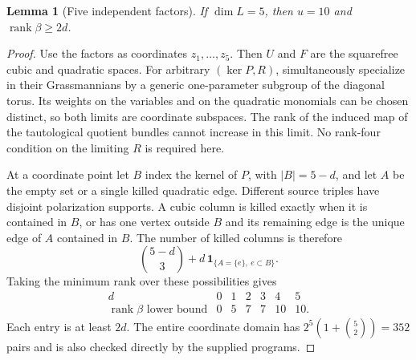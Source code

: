 \documentclass[11pt]{amsart}
\newtheorem{lemma}[theorem]{Lemma}
\theoremstyle{definition}
\numberwithin{equation}{section}
\newcommand{\rank}{\operatorname{rank}}
\begin{document}
\begin{lemma}[Five independent factors]\label{lem:independent}
If \(\dim L=5\), then \(u=10\) and \(\rank\beta\ge2d\).
\end{lemma}
\begin{proof}
Use the factors as coordinates \(z_1,\ldots,z_5\). Then \(U\) and \(F\)
are the squarefree cubic and quadratic spaces. For arbitrary
\((\ker P,R)\), simultaneously specialize in their Grassmannians by a
generic one-parameter subgroup of the diagonal torus. Its weights on the
variables and on the quadratic monomials can be chosen distinct, so both
limits are coordinate subspaces. The rank of the induced map of the
tautological quotient bundles cannot increase in this limit.
No rank-four condition on the limiting \(R\) is required here.

At a coordinate point let \(B\) index the kernel of \(P\), with
\(|B|=5-d\), and let \(A\) be the empty set or a single killed quadratic
edge. Different source triples have disjoint polarization supports.
A cubic column is killed exactly when it is contained in \(B\), or has
one vertex outside \(B\) and its remaining edge is the unique edge of
\(A\) contained in \(B\). The number of killed columns is therefore
\[
 \binom{5-d}{3}+d\,\mathbf1_{\{A=\{e\},\ e\subset B\}}.
\]
Taking the minimum rank over these possibilities gives
\[
\begin{array}{c|rrrrrr}
d&0&1&2&3&4&5\\\hline
\rank\beta\text{ lower bound}&0&5&7&7&10&10.
\end{array}
\]
Each entry is at least \(2d\). The entire coordinate domain has
\(2^5(1+\binom52)=352\) pairs and is also checked directly by the supplied
programs.
\end{proof}
\end{document}
